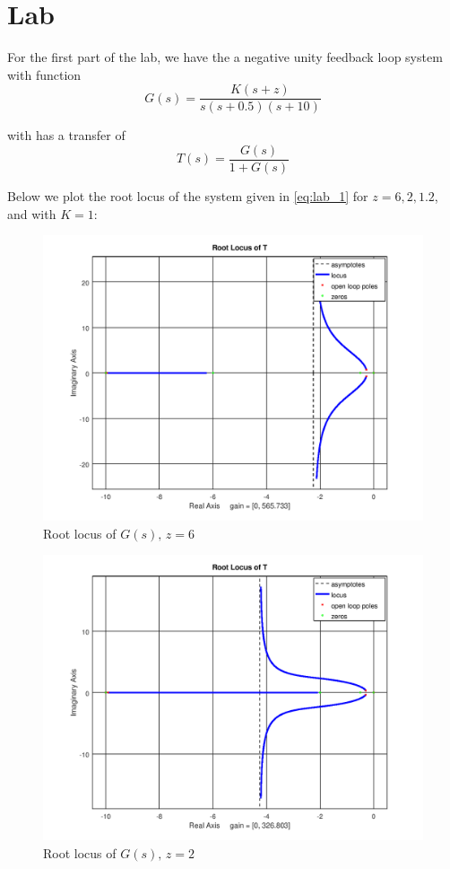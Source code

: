 \documentclass[12pt, a4paper]{article}
\begin{document}
	\section{Lab} %
	\label{sec:lab}
		For the first part of the lab, we have the a negative unity feedback loop system with function
		\begin{equation}
			G(s) = \frac{K(s+z)}{s(s+0.5)(s+10)}
			\label{eq:lab_1}
		\end{equation}

		\noindent with has a transfer of
		\begin{equation}
			T(s) = \frac{G(s)}{1 + G(s)}
			\label{eq:ts}
		\end{equation}

		Below we plot the root locus of the system given in \eqref{eq:lab_1} for $z=6,2,1.2$, and with $K=1$:

		\begin{figure}[H]
			\centering
			\includegraphics[width=.8\textwidth]{img/rlocus_1.png}
			\caption{Root locus of $G(s),\,z=6$}
			\label{fig:fig_1}
		\end{figure}

		\begin{figure}[H]
			\centering
			\includegraphics[width=.8\textwidth]{img/rlocus_2.png}
			\caption{Root locus of $G(s),\,z=2$}
			\label{fig:fig_2}
		\end{figure}
\end{document}
